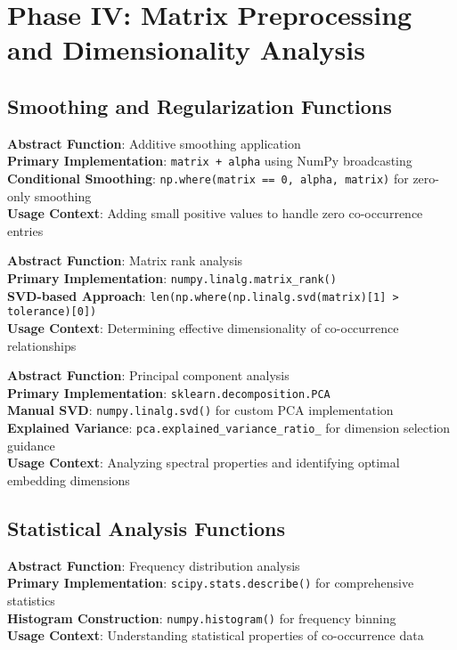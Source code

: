 \documentclass[11pt,a4paper]{article}
\begin{document}
\section{Phase IV: Matrix Preprocessing and Dimensionality Analysis}

\subsection{Smoothing and Regularization Functions}

\textbf{Abstract Function}: Additive smoothing application \\
\textbf{Primary Implementation}: \texttt{matrix + alpha} using NumPy broadcasting \\
\textbf{Conditional Smoothing}: \texttt{np.where(matrix == 0, alpha, matrix)} for zero-only smoothing \\
\textbf{Usage Context}: Adding small positive values to handle zero co-occurrence entries

\textbf{Abstract Function}: Matrix rank analysis \\
\textbf{Primary Implementation}: \texttt{numpy.linalg.matrix\_rank()} \\
\textbf{SVD-based Approach}: \texttt{len(np.where(np.linalg.svd(matrix)[1] > tolerance)[0])} \\
\textbf{Usage Context}: Determining effective dimensionality of co-occurrence relationships

\textbf{Abstract Function}: Principal component analysis \\
\textbf{Primary Implementation}: \texttt{sklearn.decomposition.PCA} \\
\textbf{Manual SVD}: \texttt{numpy.linalg.svd()} for custom PCA implementation \\
\textbf{Explained Variance}: \texttt{pca.explained\_variance\_ratio\_} for dimension selection guidance \\
\textbf{Usage Context}: Analyzing spectral properties and identifying optimal embedding dimensions

\subsection{Statistical Analysis Functions}

\textbf{Abstract Function}: Frequency distribution analysis \\
\textbf{Primary Implementation}: \texttt{scipy.stats.describe()} for comprehensive statistics \\
\textbf{Histogram Construction}: \texttt{numpy.histogram()} for frequency binning \\
\textbf{Usage Context}: Understanding statistical properties of co-occurrence data
\end{document}
